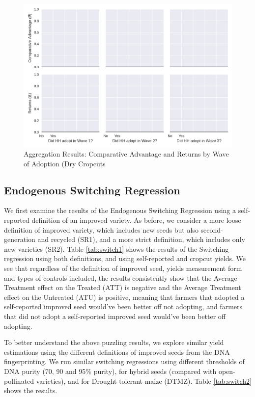 \documentclass{article}
\begin{document}
\begin{figure}
    \centering
    \includegraphics[scale=0.75]{results/figures/when_adopt_cropcut.png}
    \caption{Aggregation Results: Comparative Advantage and Returns by Wave of Adoption (Dry Cropcuts}
    \label{fig:when_adopt}
\end{figure}

\subsection{Endogenous Switching Regression}

We first examine the results of the Endogenous Switching Regression using a self-reported definition of an improved variety. As before, we consider a more loose definition of improved variety, which includes new seeds but also second-generation and recycled (SR1), and a more strict definition, which includes only new varieties (SR2). Table \ref{tab:switch1} shows the results of the Switching regression using both definitions, and using self-reported and cropcut yields. We see that regardless of the definition of improved seed, yields measurement form and types of controls included, the results consistently show that the Average Treatment effect on the Treated (ATT) is negative and the Average Treatment effect on the Untreated (ATU) is positive, meaning that farmers that adopted a self-reported improved seed would've been better off not adopting, and farmers that did not adopt a self-reported improved seed would've been better off adopting. 



To better understand the above puzzling results, we explore similar yield estimations using the different definitions of improved seeds from the DNA fingerprinting. We run similar switching regressions using different thresholds of DNA purity (70, 90 and 95\% purity), for hybrid seeds (compared with open-pollinated varieties), and for Drought-tolerant maize (DTMZ). Table \ref{tab:switch2} shows the results. 
\end{document}
